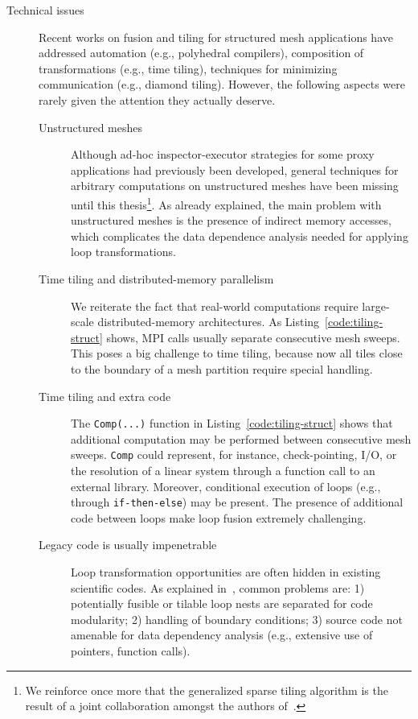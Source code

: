 \begin{description}
\item[Technical issues] Recent works on fusion and tiling for structured mesh applications have addressed automation (e.g., polyhedral compilers), composition of transformations (e.g., time tiling), techniques for minimizing communication (e.g., diamond tiling). However, the following aspects were rarely given the attention they actually deserve.
\begin{description}
\item[Unstructured meshes] Although ad-hoc inspector-executor strategies for some proxy applications had previously been developed, general techniques for arbitrary computations on unstructured meshes have been missing until this thesis\footnote{We reinforce once more that the generalized sparse tiling algorithm is the result of a joint collaboration amongst the authors of~\citep{st-paper}.}. As already explained, the main problem with unstructured meshes is the presence of indirect memory accesses, which complicates the data dependence analysis needed for applying loop transformations.
\item[Time tiling and distributed-memory parallelism] We reiterate the fact that real-world computations require large-scale distributed-memory architectures. As Listing~\ref{code:tiling-struct} shows, MPI calls usually separate consecutive mesh sweeps. This poses a big challenge to time tiling, because now all tiles close to the boundary of a mesh partition require special handling.
\item[Time tiling and extra code] The {\tt Comp(...)} function in Listing~\ref{code:tiling-struct} shows that additional computation may be performed between consecutive mesh sweeps. {\tt Comp} could represent, for instance, check-pointing, I/O, or the resolution of a linear system through a function call to an external library. Moreover, conditional execution of loops (e.g., through \texttt{if-then-else}) may be present. The presence of additional code between loops make loop fusion extremely challenging. 
\item[Legacy code is usually impenetrable] Loop transformation opportunities are often hidden in existing scientific codes. As explained in~\cite{strout-common-problems}, common problems are: 1) potentially fusible or tilable loop nests are separated for code modularity; 2) handling of boundary conditions; 3) source code not amenable for data dependency analysis (e.g., extensive use of pointers, function calls).
\end{description}


\end{description}
